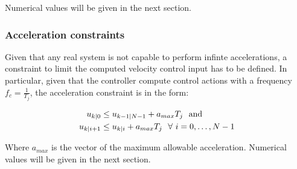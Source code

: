 	Numerical values will be given in the next section.
\subsubsection*{Acceleration constraints}
	Given that any real system is not capable to perform infinte accelerations, a constraint to limit the computed velocity control input has to be defined. In particular, given that the controller compute control actions with a frequency $f_c=\frac{1}{T_j}$, the acceleration constraint is in the form:

	\begin{equation}
		\begin{split}
			u_{k|0} &\leq u_{k-1|N-1} + a_{max} T_j\ \ \textnormal{and}\\
			u_{k|i+1} &\leq u_{k|i} + a_{max} T_j\ \  \forall\ i=0,\dots,N-1
		\end{split}	
	\end{equation}  

	Where $a_{max}$ is the vector of the maximum allowable acceleration. Numerical values will be given in the next section. 

